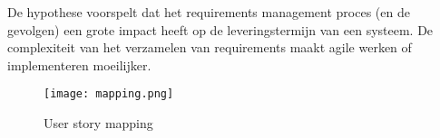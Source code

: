 De hypothese voorspelt dat het requirements management proces (en de gevolgen) een grote impact heeft op de leveringstermijn van een systeem. De complexiteit van het verzamelen van requirements maakt agile werken of implementeren moeilijker. 

\begin{figure}[b!]
    \texttt{[image: mapping.png]}
    \caption{User story mapping}
    \label{fig:mapping}
\end{figure}